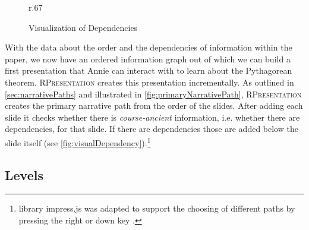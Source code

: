 \documentclass{llncs}
\newcommand{\sys}{\textsc{RPresentation}\xspace}
\begin{document}
\begin{figure}r{.67\textwidth}\vspace{-2em}
  \vspace{-1em}
  \caption{Visualization of Dependencies}\label{fig:visualDependency}
  \vspace{-1em}
\end{figure}
With the data about the order and the dependencies of information within the paper, we now
have an ordered information graph out of which we can build a first presentation that
Annie can interact with to learn about the Pytha\-go\-rean theorem. \sys creates this
presentation incrementally. As outlined in \autoref{sec:narrativePaths} and illustrated in
\autoref{fig:primaryNarrativePath}, \sys creates the primary narrative path from the order
of the slides. After adding each slide it checks whether there is \textit{course-ancient}
information, i.e. whether there are dependencies, for that slide. If there are
dependencies those are added below the slide itself (see
\autoref{fig:visualDependency}).\footnote{library impress.js was adapted to support the
  choosing of different paths by pressing the right or down key
  \cite{npentrel:npentrel15}.}


\subsection{Levels}
\label{sec:levels}
\end{document}
